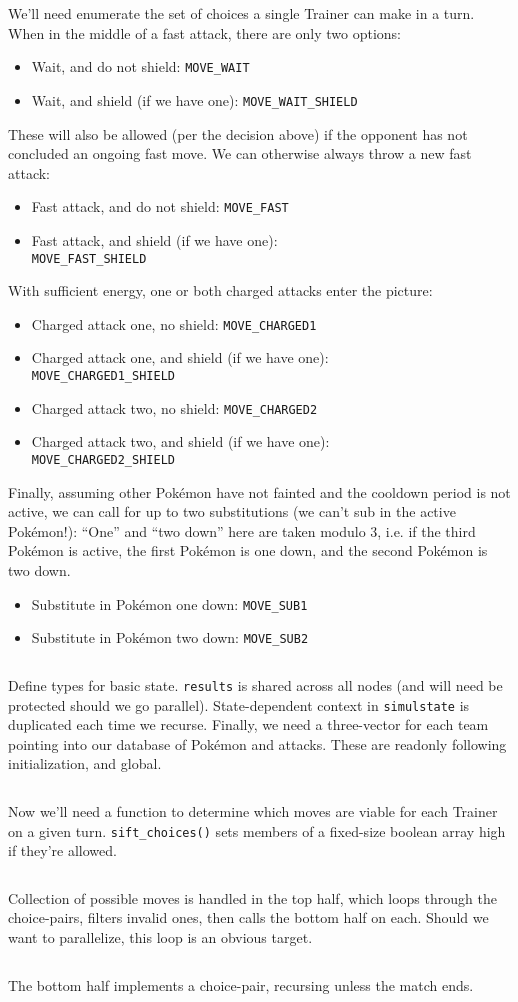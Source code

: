 We'll need enumerate the set of choices a single Trainer can make in a turn.
When in the middle of a fast attack, there are only two options:
\begin{itemize}
\item Wait, and do not shield: \texttt{MOVE\_WAIT}
\item Wait, and shield (if we have one): \texttt{MOVE\_WAIT\_SHIELD}
\end{itemize}
These will also be allowed (per the decision above) if the opponent has not concluded an ongoing fast move.
We can otherwise always throw a new fast attack:
\begin{itemize}
\item Fast attack, and do not shield: \texttt{MOVE\_FAST}
\item Fast attack, and shield (if we have one):\\
  \texttt{MOVE\_FAST\_SHIELD}
\end{itemize}
With sufficient energy, one or both charged attacks enter the picture:
\begin{itemize}
\item Charged attack one, no shield: \texttt{MOVE\_CHARGED1}
\item Charged attack one, and shield (if we have one):\\
  \texttt{MOVE\_CHARGED1\_SHIELD}
\item Charged attack two, no shield: \texttt{MOVE\_CHARGED2}
\item Charged attack two, and shield (if we have one):\\
  \texttt{MOVE\_CHARGED2\_SHIELD}
\end{itemize}
Finally, assuming other Pokémon have not fainted and the cooldown period is not active,
 we can call for up to two substitutions (we can't sub in the active Pokémon!):
``One'' and ``two down'' here are taken modulo 3,
 i.e. if the third Pokémon is active, the first Pokémon is one down,
 and the second Pokémon is two down.
\begin{itemize}
\item Substitute in Pokémon one down: \texttt{MOVE\_SUB1}
\item Substitute in Pokémon two down: \texttt{MOVE\_SUB2}
\end{itemize}
\inputminted{cpp}{s/moves.h}
Define types for basic state.
\texttt{results} is shared across all nodes (and will need be protected should we go parallel).
State-dependent context in \texttt{simulstate} is duplicated each time we recurse.
Finally, we need a three-vector for each team pointing into our database of Pokémon and attacks.
These are readonly following initialization, and global.
\inputminted{cpp}{s/simul.h}
Now we'll need a function to determine which moves are viable for each Trainer on a given turn.
\texttt{sift\_choices()} sets members of a fixed-size boolean array high if they're allowed.
\inputminted{cpp}{s/sift.h}
Collection of possible moves is handled in the top half, which loops through the choice-pairs,
  filters invalid ones, then calls the bottom half on each.
Should we want to parallelize, this loop is an obvious target.
\inputminted{cpp}{s/top.h}
The bottom half implements a choice-pair, recursing unless the match ends.
\inputminted{cpp}{s/bottom.h}
